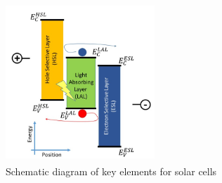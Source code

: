 \begin{figure}[b]
    \centering
    \includegraphics[width=0.5\textwidth]{Chapters/Pictures/PV_schematic_diagram.jpg}
    \caption{Schematic diagram of key elements for solar cells\textsuperscript{\cite{PV2020}}}
    \label{fig:pv}
\end{figure}